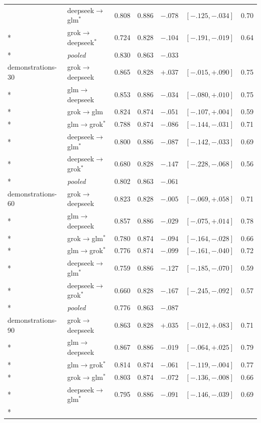 {\begin{longtable}{llrlrrr}
 & deepseek$\to$glm$^{*}$ & 0.808 & 0.886 & $-.078$ & $[-.125,-.034]$ & 0.70 \\*
 & grok$\to$deepseek$^{*}$ & 0.724 & 0.828 & $-.104$ & $[-.191,-.019]$ & 0.64 \\*
 & \emph{pooled} & 0.830 & 0.863 & $-.033$ & & \\
\addlinespace
demonstrations-30 & grok$\to$deepseek & 0.865 & 0.828 & $+.037$ & $[-.015,+.090]$ & 0.75 \\*
 & glm$\to$deepseek & 0.853 & 0.886 & $-.034$ & $[-.080,+.010]$ & 0.75 \\*
 & grok$\to$glm & 0.824 & 0.874 & $-.051$ & $[-.107,+.004]$ & 0.59 \\*
 & glm$\to$grok$^{*}$ & 0.788 & 0.874 & $-.086$ & $[-.144,-.031]$ & 0.71 \\*
 & deepseek$\to$glm$^{*}$ & 0.800 & 0.886 & $-.087$ & $[-.142,-.033]$ & 0.69 \\*
 & deepseek$\to$grok$^{*}$ & 0.680 & 0.828 & $-.147$ & $[-.228,-.068]$ & 0.56 \\*
 & \emph{pooled} & 0.802 & 0.863 & $-.061$ & & \\
\addlinespace
demonstrations-60 & grok$\to$deepseek & 0.823 & 0.828 & $-.005$ & $[-.069,+.058]$ & 0.71 \\*
 & glm$\to$deepseek & 0.857 & 0.886 & $-.029$ & $[-.075,+.014]$ & 0.78 \\*
 & grok$\to$glm$^{*}$ & 0.780 & 0.874 & $-.094$ & $[-.164,-.028]$ & 0.66 \\*
 & glm$\to$grok$^{*}$ & 0.776 & 0.874 & $-.099$ & $[-.161,-.040]$ & 0.72 \\*
 & deepseek$\to$glm$^{*}$ & 0.759 & 0.886 & $-.127$ & $[-.185,-.070]$ & 0.59 \\*
 & deepseek$\to$grok$^{*}$ & 0.660 & 0.828 & $-.167$ & $[-.245,-.092]$ & 0.57 \\*
 & \emph{pooled} & 0.776 & 0.863 & $-.087$ & & \\
\addlinespace
demonstrations-90 & grok$\to$deepseek & 0.863 & 0.828 & $+.035$ & $[-.012,+.083]$ & 0.71 \\*
 & glm$\to$deepseek & 0.867 & 0.886 & $-.019$ & $[-.064,+.025]$ & 0.79 \\*
 & glm$\to$grok$^{*}$ & 0.814 & 0.874 & $-.061$ & $[-.119,-.004]$ & 0.77 \\*
 & grok$\to$glm$^{*}$ & 0.803 & 0.874 & $-.072$ & $[-.136,-.008]$ & 0.66 \\*
 & deepseek$\to$glm$^{*}$ & 0.795 & 0.886 & $-.091$ & $[-.146,-.039]$ & 0.69 \\*

\end{longtable}}

